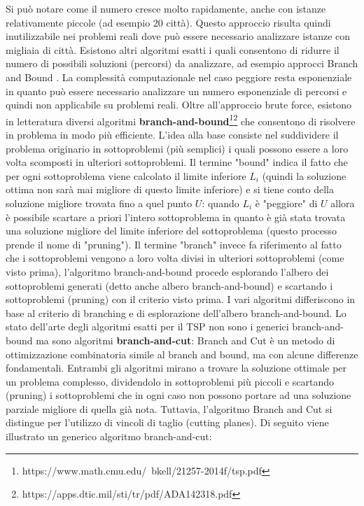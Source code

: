 \documentclass[a4paper,12pt]{report}
\begin{document}
Si può notare come il numero cresce molto rapidamente, anche con istanze relativamente piccole (ad esempio 20 città). Questo approccio risulta quindi inutilizzabile nei problemi reali dove può essere necessario analizzare istanze con migliaia di città.
\newline \null \newline Esistono altri algoritmi esatti i quali consentono di ridurre il numero di possibili soluzioni (percorsi) da analizzare, ad esempio approcci Branch and Bound \cite{Branch and Bound}. La complessità computazionale nel caso peggiore resta esponenziale in quanto può essere necessario analizzare un numero esponenziale di percorsi e quindi non applicabile su problemi reali.
\newline \null \newline 
Oltre all'approccio brute force, esistono in letteratura diversi algoritmi \textbf{branch-and-bound}\footnote[1]{https://www.math.cmu.edu/~bkell/21257-2014f/tsp.pdf}\footnote[2]{https://apps.dtic.mil/sti/tr/pdf/ADA142318.pdf} che consentono di risolvere in problema in modo più efficiente. L'idea alla base consiste nel suddividere il problema originario in sottoproblemi (più semplici) i quali possono essere a loro volta scomposti in ulteriori sottoproblemi. Il termine "bound" indica il fatto che per ogni sottoproblema viene calcolato il limite inferiore $L_i$ (quindi la soluzione ottima non sarà mai migliore di questo limite inferiore) e si tiene conto della soluzione migliore trovata fino a quel punto $U$: quando $L_i$ è "peggiore" di $U$ allora è possibile scartare a priori l'intero sottoproblema in quanto è già stata trovata una soluzione migliore del limite inferiore del sottoproblema (questo processo prende il nome di "pruning"). Il termine "branch" invece fa riferimento al fatto che i sottoproblemi vengono a loro volta divisi in ulteriori sottoproblemi (come visto prima), l'algoritmo branch-and-bound procede esplorando l'albero dei sottoproblemi generati (detto anche albero branch-and-bound) e scartando i sottoproblemi (pruning) con il criterio visto prima. I vari algoritmi differiscono in base al criterio di branching e di esplorazione dell'albero branch-and-bound. \newline \null \newline
Lo stato dell'arte degli algoritmi esatti per il TSP non sono i generici branch-and-bound ma sono algoritmi \textbf{branch-and-cut}\cite{Branch and Cut}: Branch and Cut è un metodo di ottimizzazione combinatoria simile al branch and bound, ma con alcune differenze fondamentali. Entrambi gli algoritmi mirano a trovare la soluzione ottimale per un problema complesso, dividendolo in sottoproblemi più piccoli e scartando (pruning) i sottoproblemi che in ogni caso non possono portare ad una soluzione parziale migliore di quella già nota. Tuttavia, l'algoritmo Branch and Cut si distingue per l'utilizzo di vincoli di taglio (cutting planes). Di seguito viene illustrato un generico algoritmo branch-and-cut:
\end{document}
